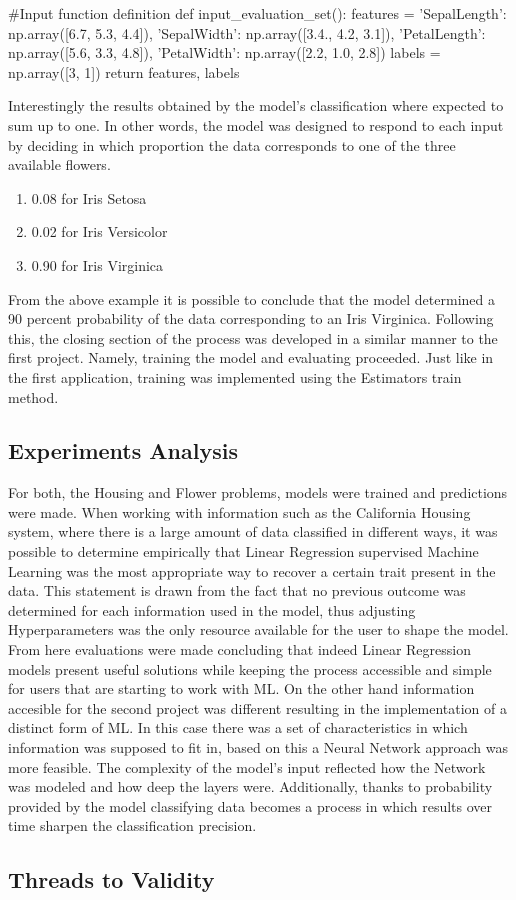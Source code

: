 \begin{tensorflow}[caption={ads}]
#Input function definition
def input_evaluation_set():
    features = {'SepalLength': np.array([6.7, 5.3, 4.4]),
                'SepalWidth':  np.array([3.4., 4.2, 3.1]),
                'PetalLength': np.array([5.6, 3.3, 4.8]),
                'PetalWidth':  np.array([2.2, 1.0, 2.8])}
    labels = np.array([3, 1])
    return features, labels
\end{tensorflow}

Interestingly the results obtained by the model's classification where expected to sum up to one. In other words, the model was designed to respond to each input by deciding in which proportion the data corresponds to one of the three available flowers. 

\begin{enumerate}
 \item 0.08 for Iris Setosa
 \item 0.02 for Iris Versicolor
 \item 0.90 for Iris Virginica
\end{enumerate}

From the above example it is possible to conclude that the model determined a 90 percent probability of the data corresponding to an Iris Virginica.   Following this, the closing section of the process was developed in a similar manner to the first project. Namely, training the model and evaluating proceeded. Just like in the first  application, training was implemented using the Estimators train method. 

\subsection{Experiments Analysis}

For both, the Housing and Flower problems, models were trained and predictions were made. When working with information such as the California Housing system, where there is a large amount of data classified in different ways, it was possible to determine empirically that Linear Regression supervised Machine Learning was the most appropriate way to recover a certain trait present in the data. This statement is drawn from the fact that no previous outcome was determined for each information used in the model, thus adjusting Hyperparameters was the only resource available for the user to shape the model.  From here evaluations were made concluding that indeed Linear Regression models present useful solutions while keeping the process accessible and simple for users that are starting to work with \ac{ML}.  On the other hand information accesible for the second project was different resulting in the implementation of a distinct form of \ac{ML}. In this case there was a set of characteristics in which information was supposed to fit in, based on this a Neural Network approach was more feasible. The complexity of the model's input reflected how the Network was modeled and how deep the layers were. Additionally, thanks to probability provided by the model classifying data becomes a process in which results over time sharpen the classification precision. 

\subsection{Threads to Validity}



\endinput



